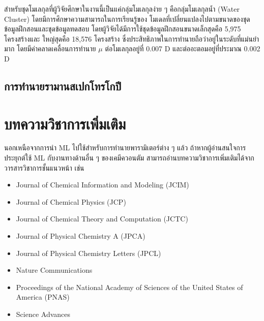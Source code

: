 สำหรับชุดโมเลกุลที่ผู้วิจัยศึกษาในงานนี้เป็นแค่กลุ่มโมเลกุลง่าย ๆ คือกลุ่มโมเลกุลน้ำ (Water Cluster) โดยมีการศึกษาความสามารถในการเรียนรู้ของ%
โมเดลที่เปลี่ยนแปลงไปตามขนาดของชุดข้อมูลฝึกสอนและชุดข้อมูลทดสอบ โดยผู้วิจัยได้มีการใช้ชุดข้อมูลฝึกสอนขนาดเล็กสุดคือ 5,975 โครงสร้างและ%
ใหญ่สุดคือ 18,576 โครงสร้าง ซึ่งประสิทธิภาพในการทำนายถือว่าอยู่ในระดับที่แม่นยำมาก โดยมีค่าคลาดเคลื่อนการทำนาย $\mu$ ต่อโมเลกุลอยู่ที่
0.007 D และต่ออะตอมอยู่ที่ประมาณ 0.002 D

\subsection{การทำนายรามานสเปกโทรโกปี}
\label{ssec:pred_spec_raman}

\section{บทความวิชาการเพิ่มเติม}
\label{sec:pred_misc_papers}

นอกเหนือจากการนำ ML ไปใช้สำหรับการทำนายพารามิเตอร์ต่าง ๆ แล้ว ถ้าหากผู้อ่านสนใจการประยุกต์ใช้ ML กับงานทางด้านอื่น ๆ ของเคมีควอนตัม 
สามารถอ่านบทความวิชาการเพิ่มเติมได้จากวารสารวิชาการชั้นแนวหน้า เช่น 

\begin{itemize}[noitemsep]
    \item Journal of Chemical Information and Modeling (JCIM) 
    
    \item Journal of Chemical Physics (JCP)
    
    \item Journal of Chemical Theory and Computation (JCTC)
    
    \item Journal of Physical Chemistry A (JPCA)
    
    \item Journal of Physical Chemistry Letters (JPCL)
    
    \item Nature Communications
    
    \item Proceedings of the National Academy of Sciences of the United States of America (PNAS)
    
    \item Science Advances
\end{itemize}

